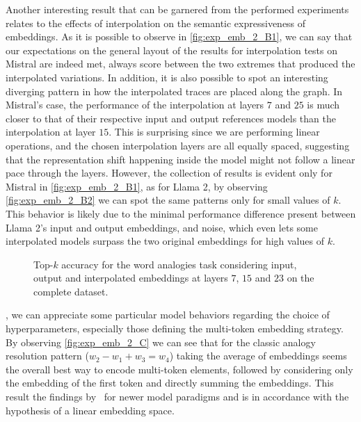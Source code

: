 Another interesting result that can be garnered from the performed experiments relates to the effects of interpolation on the semantic expressiveness of embeddings.
As it is possible to observe in \cref{fig:exp_emb_2_B1}, we can say that our expectations on the general layout of the results for interpolation tests on Mistral are indeed met,  always score between the two extremes that produced the interpolated variations.
In addition, it is also possible to spot an interesting diverging pattern in how the interpolated traces are placed along the graph.
In Mistral's case, the performance of the interpolation at layers $7$ and $25$ is much closer to that of their respective input and output references models than the interpolation at layer $15$.
This is surprising since we are performing linear operations, and the chosen interpolation layers are all equally spaced, suggesting that the representation shift happening inside the model might not follow a linear pace through the layers.
However, the  collection of results is evident only for Mistral in \cref{fig:exp_emb_2_B1}, as for Llama 2, by observing \cref{fig:exp_emb_2_B2} we can spot the same patterns only for small values of $k$.
This behavior is likely due to the minimal performance difference present between Llama 2's input and output embeddings, and noise, which even lets some interpolated models surpass the two original embeddings for high values of $k$.

\begin{figure}[t!]
    \centering
    \caption[Top-$k$ accuracy for the word analogies task considering input, output and interpolated embeddings on the complete dataset.]{Top-$k$ accuracy for the word analogies task considering input, output and interpolated embeddings at layers $7$, $15$ and $23$ on the complete dataset.}
    \label{fig:exp_emb_2_B}
\end{figure}

, we can appreciate some particular model behaviors regarding the choice of hyperparameters, especially those defining the multi-token embedding strategy.
By observing \cref{fig:exp_emb_2_C} we can see that for the classic analogy resolution pattern ($w_2 - w_1 + w_3 = w_4$) taking the average of embeddings seems the overall best way to encode multi-token elements, followed by considering only the embedding of the first token and directly summing the embeddings.
This result  the findings  by~\citet{drozd2016} for newer model paradigms and is in accordance with the hypothesis of a linear embedding space.

